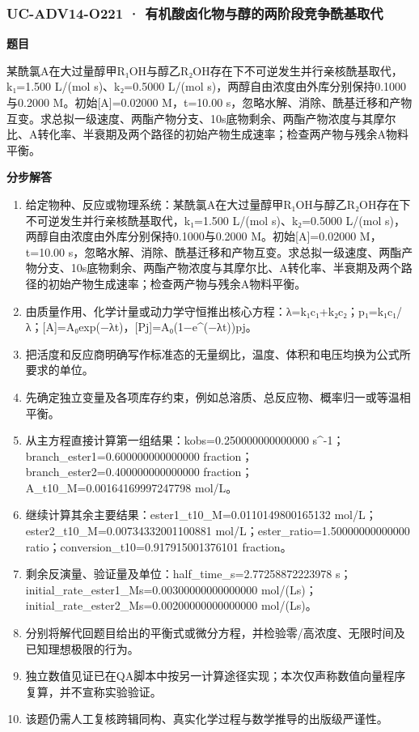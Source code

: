 \documentclass[UTF8,11pt,a4paper]{ctexart}
\begin{document}
\subsubsection*{UC-ADV14-O221 · 有机酸卤化物与醇的两阶段竞争酰基取代}
\noindent\textbf{题目}\par
某酰氯A在大过量醇甲R₁OH与醇乙R₂OH存在下不可逆发生并行亲核酰基取代，k₁=1.500 L/(mol s)、k₂=0.5000 L/(mol s)，两醇自由浓度由外库分别保持0.1000与0.2000 M。初始[A]=0.02000 M，t=10.00 s，忽略水解、消除、酰基迁移和产物互变。求总拟一级速度、两酯产物分支、10s底物剩余、两酯产物浓度与其摩尔比、A转化率、半衰期及两个路径的初始产物生成速率；检查两产物与残余A物料平衡。\par
\medskip\noindent\textbf{分步解答}
\begin{enumerate}
\item 给定物种、反应或物理系统：某酰氯A在大过量醇甲R₁OH与醇乙R₂OH存在下不可逆发生并行亲核酰基取代，k₁=1.500 L/(mol s)、k₂=0.5000 L/(mol s)，两醇自由浓度由外库分别保持0.1000与0.2000 M。初始[A]=0.02000 M，t=10.00 s，忽略水解、消除、酰基迁移和产物互变。求总拟一级速度、两酯产物分支、10s底物剩余、两酯产物浓度与其摩尔比、A转化率、半衰期及两个路径的初始产物生成速率；检查两产物与残余A物料平衡。
\item 由质量作用、化学计量或动力学守恒推出核心方程：λ=k₁c₁+k₂c₂；p₁=k₁c₁/λ；[A]=A₀exp(−λt)，[Pj]=A₀(1−e\textasciicircum{}(−λt))pj。
\item 把活度和反应商明确写作标准态的无量纲比，温度、体积和电压均换为公式所要求的单位。
\item 先确定独立变量及各项库存约束，例如总溶质、总反应物、概率归一或等温相平衡。
\item 从主方程直接计算第一组结果：kobs=0.250000000000000 s\textasciicircum{}-1；branch\_ester1=0.600000000000000 fraction；branch\_ester2=0.400000000000000 fraction；A\_t10\_M=0.00164169997247798 mol/L。
\item 继续计算其余主要结果：ester1\_t10\_M=0.0110149800165132 mol/L；ester2\_t10\_M=0.00734332001100881 mol/L；ester\_ratio=1.50000000000000 ratio；conversion\_t10=0.917915001376101 fraction。
\item 剩余反演量、验证量及单位：half\_time\_s=2.77258872223978 s；initial\_rate\_ester1\_Ms=0.00300000000000000 mol/(Ls)；initial\_rate\_ester2\_Ms=0.00200000000000000 mol/(Ls)。
\item 分别将解代回题目给出的平衡式或微分方程，并检验零/高浓度、无限时间及已知理想极限的行为。
\item 独立数值见证已在QA脚本中按另一计算途径实现；本次仅声称数值向量程序复算，并不宣称实验验证。
\item 该题仍需人工复核跨辑同构、真实化学过程与数学推导的出版级严谨性。
\end{enumerate}
\end{document}
